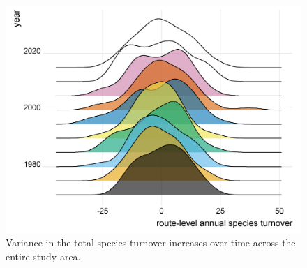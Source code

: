 \documentclass[print]{nuthesis}
\begin{document}
\begin{figure}
\includegraphics[width=0.85\linewidth]{.//chapterFiles/discontinuityAnalysis/figsCalledInDiss/turnoverByYear} \caption{Variance in the total species turnover increases over time across the entire study area.}\label{fig:turnoverByYear}
\end{figure}
\end{document}
